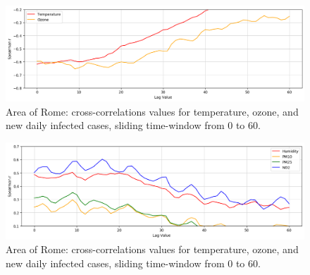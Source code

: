 \documentclass[review]{elsarticle}
\begin{document}



\begin{figure}[htbp]
	\centering
	\includegraphics[width=\linewidth]{img/corr_temp_rome.png}
	\caption{Area of Rome: cross-correlations values for temperature, ozone, and new daily infected cases, sliding time-window from $0$ to $60$.}
	\label{fig:corr_roma_in}
\end{figure}
\begin{figure}[htbp]
	\centering
	\includegraphics[width=\linewidth]{img/corr_pm_rome.png}
	\caption{Area of Rome: cross-correlations values for temperature, ozone, and new daily infected cases, sliding time-window from $0$ to $60$.}
	\label{fig:corr_pm_roma_in}
\end{figure}
\end{document}
